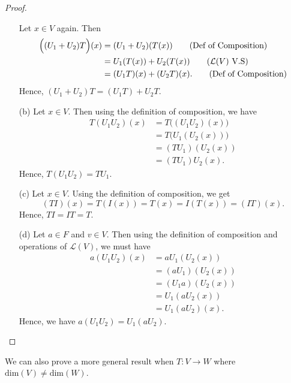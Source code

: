 \begin{proof}
\begin{enumerate}
    Let \( x \in V  \) again. Then
    \begin{align*}
        \Big( ({U}_{1} + {U}_{2})T \Big) (x)  &= ({U}_{1} + {U}_{2})(T(x))   \tag{Def of Composition}  \\
                                              &= {U}_{1}(T(x)) + {U}_{2}(T(x)) \tag{\( \mathcal{L}(V) \) V.S} \\
                                              &= ({U}_{1}T)(x) + ({U}_{2}T)(x). \tag{Def of Composition}
    \end{align*}
    Hence, \( ({U}_{1}  + {U}_{2})T = ({U}_{1} T)  + {U}_{2}T  \).
    \item[(b)] Let \( x \in V  \). Then using the definition of composition, we have
    \begin{align*}
        T({U}_{1}{U}_{2})(x) &= T \Big( ({U}_{1} {U}_{2})(x) \Big) \\
                             &=  T \Big( {U}_{1} ({U}_{2}(x)) \Big) \\
                             &= ({TU}_{1})({U}_{2}(x)) \\
                             &= ({TU}_{1}){U}_{2}(x).
    \end{align*}
    Hence, \( T({U}_{1}{U}_{2}) = {TU}_{1} \).
    \item[(c)] Let \( x \in V  \). Using the definition of composition, we get
        \[  (TI)(x) = T(I(x)) = T(x) = I(T(x)) = (IT)(x). \]
        Hence, \( TI = IT = T \).
    \item[(d)] Let \( a \in F  \) and \( v \in V \). Then using the definition of composition and operations of \( \mathcal{L}(V) \), we must have
        \begin{align*}
            a({U}_{1} {U}_{2})(x) &= a {U}_{1}({U}_{2}(x)) \\
                                  &= ({aU}_{1})({U}_{2}(x)) \\
                                  &= ({U}_{1}a)({U}_{2}(x)) \\
                                  &= {U}_{1}( {aU}_{2}(x)) \\
                                  &= {U}_{1} ({aU}_{2})(x).
        \end{align*}
        Hence, we have \( a({U}_{1}{U}_{2}) = {U}_{1} ({aU}_{2}) \).
    \end{enumerate}
\end{proof}

We can also prove a more general result when \( T: V \to W   \) where  \( \text{dim}(V) \neq \text{dim}(W) \).

